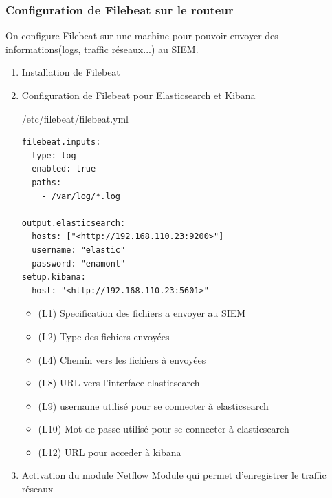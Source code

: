 \documentclass{article}
\begin{document}
\subsubsection{Configuration de Filebeat sur le routeur}
On configure Filebeat sur une machine pour pouvoir envoyer des informations(logs, traffic réseaux...) au SIEM.

\begin{enumerate}
	\item Installation de Filebeat

	\item Configuration de Filebeat pour Elasticsearch et Kibana
	\begin{configbox}{/etc/filebeat/filebeat.yml}
		\begin{lstlisting}
filebeat.inputs:
- type: log
  enabled: true
  paths:
    - /var/log/*.log

output.elasticsearch:
  hosts: ["<http://192.168.110.23:9200>"]
  username: "elastic"
  password: "enamont"
setup.kibana:
  host: "<http://192.168.110.23:5601>"

		\end{lstlisting}
	\end{configbox}

	\begin{itemize}
		\item (L1) Specification des fichiers a envoyer au SIEM
		\item (L2) Type des fichiers envoyées
		\item (L4) Chemin vers les fichiers à envoyées
		\item (L8) URL vers l'interface elasticsearch
		\item (L9) username utilisé pour se connecter à elasticsearch
		\item (L10) Mot de passe utilisé pour se connecter à elasticsearch
		\item (L12) URL pour acceder à kibana
	\end{itemize}

	\item Activation du module Netflow
	Module qui permet d'enregistrer le traffic réseaux


	
\end{enumerate}
\end{document}
